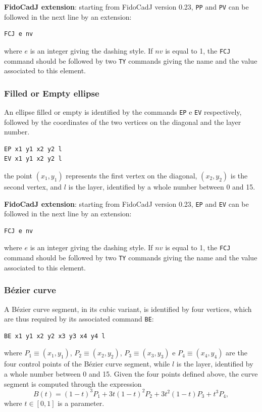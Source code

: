 \documentclass[10pt,a4paper,twoside]{scrreprt}
\begin{document}
\textbf{FidoCadJ extension}: starting from FidoCadJ version 0.23,  \lstinline!PP! and \lstinline!PV! can be followed in the next line by an extension:
\begin{lstlisting}
FCJ e nv
\end{lstlisting}
where $e$ is an integer giving the dashing style. If $nv$ is equal to 1, the \lstinline!FCJ! command should be followed by two \lstinline!TY! commands giving the name and the value associated to this element.


\subsubsection{Filled or Empty ellipse}

An ellipse filled or empty is identified by the commands
\lstinline!EP! e \lstinline!EV! respectively,
followed by the coordinates of the two vertices on the diagonal and
the layer number.
\begin{lstlisting}
EP x1 y1 x2 y2 l
EV x1 y1 x2 y2 l
\end{lstlisting}
the point $(x_{1},y_{1})$ represents the first
vertex on the diagonal, $(x_{2},y_{2})$ is the second vertex, and
$l$ is the layer, identified by a whole number between 0 and 15.


\textbf{FidoCadJ extension}: starting from FidoCadJ version 0.23,  \lstinline!EP! and \lstinline!EV! can be followed in the next line by an extension:
\begin{lstlisting}
FCJ e nv
\end{lstlisting}
where $e$ is an integer giving the dashing style. If $nv$ is equal to 1, the \lstinline!FCJ! command should be followed by two \lstinline!TY! commands giving the name and the value associated to this element.


\subsubsection{B\'ezier curve}

A B\'ezier curve segment, in its cubic variant, is identified
by four vertices, which are thus required by its associated command
\lstinline!BE!:
\begin{lstlisting}
BE x1 y1 x2 y2 x3 y3 x4 y4 l
\end{lstlisting}
where $P_{1}\equiv(x_{1},y_{1})$, $P_{2}\equiv(x_{2},y_{2})$,
$P_{3}\equiv(x_{3},y_{3})$ e $P_{4}\equiv(x_{4},y_{4})$ are the
four control points of the B\'ezier curve segment, while
$l$ is the layer, identified by a whole number between 0 and 15.
Given the four points defined above, the curve segment is computed
through the expression \begin{equation}
B(t)=(1-t)^{3}P_{1}+3t(1-t)^{2}P_{2}+3t^{2}(1-t)P_{3}+t^{3}P_{4},\end{equation}
where $t\in[0,1]$ is a parameter.
\end{document}
